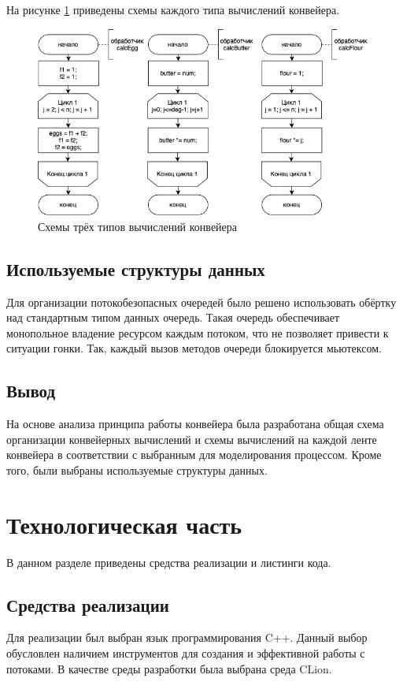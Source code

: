 \documentclass[12pt]{report}
\begin{document}
На рисунке \ref{fig:steps} приведены схемы каждого типа вычислений конвейера. 
\begin{figure}[h]
	\centering
	\includegraphics[width = \linewidth]{steps.jpg}
	\caption{Схемы трёх типов вычислений конвейера}
	\label{fig:steps}
\end{figure}

\section{Используемые структуры данных}
Для организации потокобезопасных очередей было решено использовать обёртку над стандартным типом данных очередь. Такая очередь обеспечивает монопольное владение ресурсом каждым потоком, что не позволяет привести к ситуации гонки. Так, каждый вызов методов очереди блокируется мьютексом.
\section*{Вывод}
На основе анализа принципа работы конвейера была разработана общая схема организации конвейерных вычислений и схемы вычислений на каждой ленте конвейера в соответствии с выбранным для моделирования процессом. Кроме того, были выбраны используемые структуры данных.

\chapter{Технологическая часть}

В данном разделе приведены средства реализации и листинги кода.

\section{Средства реализации}
Для реализации был выбран язык программирования C++. Данный выбор обусловлен наличием инструментов для создания и эффективной работы с потоками. В качестве среды разработки была выбрана среда CLion. 
\end{document}
